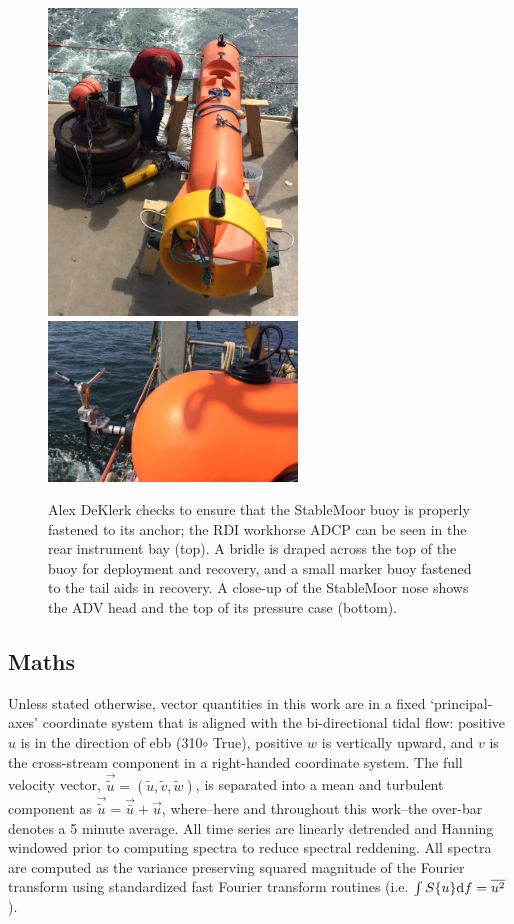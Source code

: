 \documentclass[twocol]{ametsoc}
\begin{document}
\begin{figure}[t]
  \centering
  \includegraphics[width=2.6in]{SM_ondeck01}
  \includegraphics[width=2.6in]{SM_NoseMode01}
  \caption{Alex DeKlerk checks to ensure that the StableMoor buoy is properly fastened to its anchor; the RDI workhorse ADCP can be seen in the rear instrument bay (top). A bridle is draped across the top of the buoy for deployment and recovery, and a small marker buoy fastened to the tail aids in recovery.  A close-up of the StableMoor nose shows the ADV head and the top of its pressure case (bottom). }
  \label{fig:SM}
\end{figure}


\subsection{Maths}

Unless stated otherwise, vector quantities in this work are in a fixed `principal-axes' coordinate system that is aligned with the bi-directional tidal flow: positive $u$ is in the direction of ebb (310$\circ$ True), positive $w$ is vertically upward, and $v$ is the cross-stream component in a right-handed coordinate system. The full velocity vector, $\vec{\tilde{u}} = (\tilde{u}, \tilde{v}, \tilde{w})$, is separated into a mean and turbulent component as $\vec{\tilde{u}} = \vec{\bar{u}} + \vec{u}$, where--here and throughout this work--the over-bar denotes a 5 minute average.  All time series are linearly detrended and Hanning windowed prior to computing spectra to reduce spectral reddening. All spectra are computed as the variance preserving squared magnitude of the Fourier transform using standardized fast Fourier transform routines (i.e. $\int S\{u\}\mathrm{d}f = \overline{u^2}$).
\end{document}
